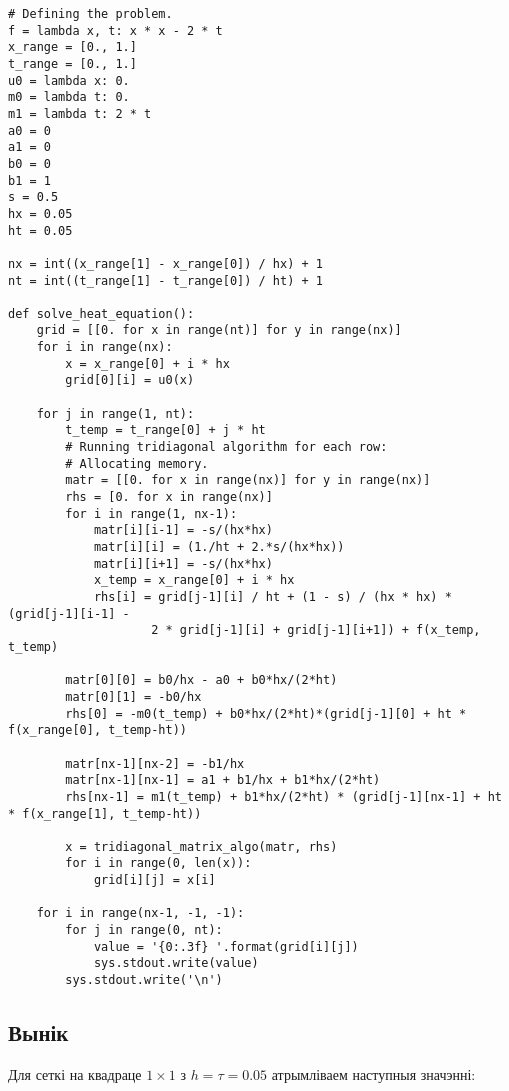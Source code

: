 {\small
\begin{verbatim}
# Defining the problem.
f = lambda x, t: x * x - 2 * t
x_range = [0., 1.]
t_range = [0., 1.]
u0 = lambda x: 0.
m0 = lambda t: 0.
m1 = lambda t: 2 * t
a0 = 0
a1 = 0
b0 = 0
b1 = 1
s = 0.5
hx = 0.05
ht = 0.05

nx = int((x_range[1] - x_range[0]) / hx) + 1
nt = int((t_range[1] - t_range[0]) / ht) + 1

def solve_heat_equation():
    grid = [[0. for x in range(nt)] for y in range(nx)]
    for i in range(nx):
        x = x_range[0] + i * hx
        grid[0][i] = u0(x)

    for j in range(1, nt):
        t_temp = t_range[0] + j * ht
        # Running tridiagonal algorithm for each row:
        # Allocating memory.
        matr = [[0. for x in range(nx)] for y in range(nx)]
        rhs = [0. for x in range(nx)]
        for i in range(1, nx-1):
            matr[i][i-1] = -s/(hx*hx)
            matr[i][i] = (1./ht + 2.*s/(hx*hx))
            matr[i][i+1] = -s/(hx*hx)
            x_temp = x_range[0] + i * hx
            rhs[i] = grid[j-1][i] / ht + (1 - s) / (hx * hx) * (grid[j-1][i-1] -
                    2 * grid[j-1][i] + grid[j-1][i+1]) + f(x_temp, t_temp)

        matr[0][0] = b0/hx - a0 + b0*hx/(2*ht)
        matr[0][1] = -b0/hx
        rhs[0] = -m0(t_temp) + b0*hx/(2*ht)*(grid[j-1][0] + ht * f(x_range[0], t_temp-ht))

        matr[nx-1][nx-2] = -b1/hx
        matr[nx-1][nx-1] = a1 + b1/hx + b1*hx/(2*ht)
        rhs[nx-1] = m1(t_temp) + b1*hx/(2*ht) * (grid[j-1][nx-1] + ht * f(x_range[1], t_temp-ht))

        x = tridiagonal_matrix_algo(matr, rhs)
        for i in range(0, len(x)):
            grid[i][j] = x[i]

    for i in range(nx-1, -1, -1):
        for j in range(0, nt):
            value = '{0:.3f} '.format(grid[i][j])
            sys.stdout.write(value)
        sys.stdout.write('\n')
\end{verbatim}
}

\subsection*{Вынік}

Для сеткі на квадраце $1\times1$ з $h = \tau = 0.05$ атрымліваем наступныя значэнні:\par

